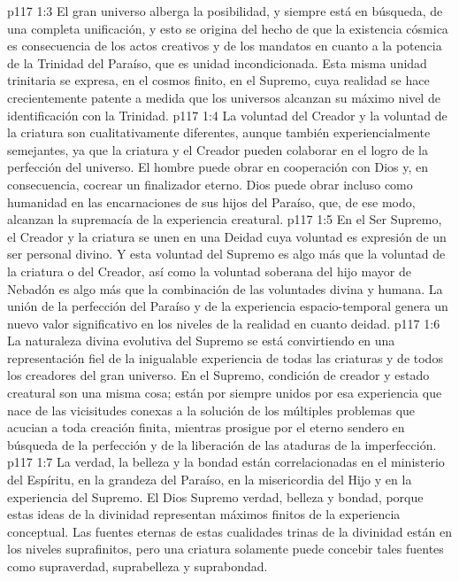 \vs p117 1:3 El gran universo alberga la posibilidad, y siempre está en búsqueda, de una completa unificación, y esto se origina del hecho de que la existencia cósmica es consecuencia de los actos creativos y de los mandatos en cuanto a la potencia de la Trinidad del Paraíso, que es unidad incondicionada. Esta misma unidad trinitaria se expresa, en el cosmos finito, en el Supremo, cuya realidad se hace crecientemente patente a medida que los universos alcanzan su máximo nivel de identificación con la Trinidad.
\vs p117 1:4 \pc La voluntad del Creador y la voluntad de la criatura son cualitativamente diferentes, aunque también experiencialmente semejantes, ya que la criatura y el Creador pueden colaborar en el logro de la perfección del universo. El hombre puede obrar en cooperación con Dios y, en consecuencia, cocrear un finalizador eterno. Dios puede obrar incluso como humanidad en las encarnaciones de sus hijos del Paraíso, que, de ese modo, alcanzan la supremacía de la experiencia creatural.
\vs p117 1:5 En el Ser Supremo, el Creador y la criatura se unen en una Deidad cuya voluntad es expresión de un ser personal divino. Y esta voluntad del Supremo es algo más que la voluntad de la criatura o del Creador, así como la voluntad soberana del hijo mayor de Nebadón es algo más que la combinación de las voluntades divina y humana. La unión de la perfección del Paraíso y de la experiencia espacio\hyp{}temporal genera un nuevo valor significativo en los niveles de la realidad en cuanto deidad.
\vs p117 1:6 La naturaleza divina evolutiva del Supremo se está convirtiendo en una representación fiel de la inigualable experiencia de todas las criaturas y de todos los creadores del gran universo. En el Supremo, condición de creador y estado creatural son una misma cosa; están por siempre unidos por esa experiencia que nace de las vicisitudes conexas a la solución de los múltiples problemas que acucian a toda creación finita, mientras prosigue por el eterno sendero en búsqueda de la perfección y de la liberación de las ataduras de la imperfección.
\vs p117 1:7 \pc La verdad, la belleza y la bondad están correlacionadas en el ministerio del Espíritu, en la grandeza del Paraíso, en la misericordia del Hijo y en la experiencia del Supremo. El Dios Supremo  verdad, belleza y bondad, porque estas ideas de la divinidad representan máximos finitos de la experiencia conceptual. Las fuentes eternas de estas cualidades trinas de la divinidad están en los niveles suprafinitos, pero una criatura solamente puede concebir tales fuentes como supraverdad, suprabelleza y suprabondad.
